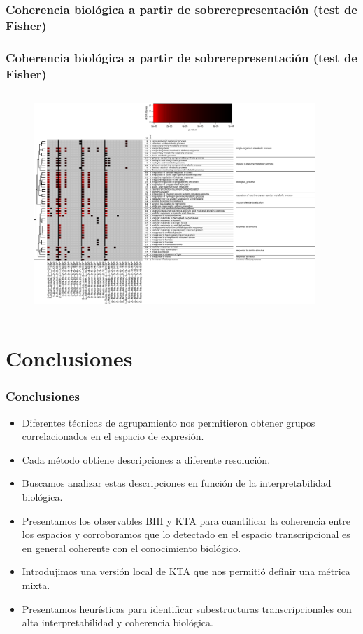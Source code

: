 \documentclass[serif,9pt, t]{beamer}
\begin{document}
\subsubsection*{Coherencia biológica a partir de sobrerepresentación (test de Fisher)}
\begin{frame}\frametitle{Coherencia biológica a partir de sobrerepresentación (test de Fisher)} 
\vspace{-30pt}
\begin{columns}
\column{\dimexpr\paperwidth-10pt}
\begin{figure}
\centering
\includegraphics[width=0.95\textwidth]{fisher_grupo_2.pdf}
\end{figure}
\end{columns}
\end{frame}

\section{Conclusiones}
\begin{frame}\frametitle{Conclusiones}
\bigskip
\begin{itemize}
\item Diferentes técnicas de agrupamiento nos permitieron obtener grupos correlacionados en el espacio de expresión.
\item Cada método obtiene descripciones a diferente resolución.
\item Buscamos analizar estas descripciones en función de la interpretabilidad biológica.
\item Presentamos los observables BHI y KTA para cuantificar la coherencia entre los espacios y corroboramos que lo detectado en el espacio transcripcional es en general coherente con el conocimiento biológico.
\item Introdujimos una versión local de KTA que nos permitió definir una métrica mixta.
\item Presentamos heurísticas para identificar subestructuras transcripcionales con alta interpretabilidad y coherencia biológica.
\end{itemize}
\end{frame}
\end{document}
